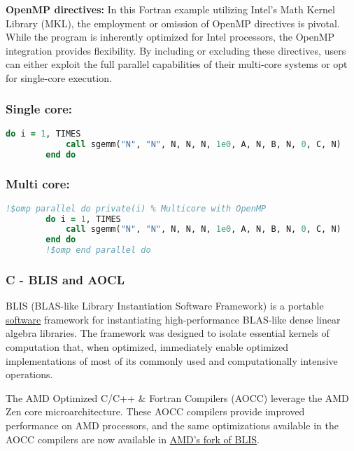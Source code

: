 \textbf{OpenMP directives:} In this Fortran example utilizing Intel's Math Kernel Library (MKL), the employment or omission of OpenMP directives is pivotal. While the program is inherently optimized for Intel processors, the OpenMP integration provides flexibility. By including or excluding these directives, users can either exploit the full parallel capabilities of their multi-core systems or opt for single-core execution. 

\subsubsection*{Single core:}

\begin{lstlisting}[language=Fortran]
        do i = 1, TIMES
            call sgemm("N", "N", N, N, N, 1e0, A, N, B, N, 0, C, N)
        end do
\end{lstlisting}

\subsubsection*{Multi core:}

\begin{lstlisting}[language=Fortran]
        !$omp parallel do private(i) % Multicore with OpenMP
        do i = 1, TIMES
            call sgemm("N", "N", N, N, N, 1e0, A, N, B, N, 0, C, N)
        end do
        !$omp end parallel do
\end{lstlisting}

\clearpage

\subsubsection{C - BLIS and AOCL}

BLIS (BLAS-like Library Instantiation Software Framework) is a portable \href{https://github.com/flame/blis#how-to-download-blis}{software} framework for instantiating high-performance BLAS-like dense linear algebra libraries. The framework was designed to isolate essential kernels of computation that, when optimized, immediately enable optimized implementations of most of its commonly used and computationally intensive operations.

The AMD Optimized C/C++ \& Fortran Compilers (AOCC) leverage the AMD Zen core microarchitecture. These AOCC compilers provide improved performance on AMD processors, and the same optimizations available in the AOCC compilers are now available in \href{https://github.com/amd/blis}{AMD's fork of BLIS}.

